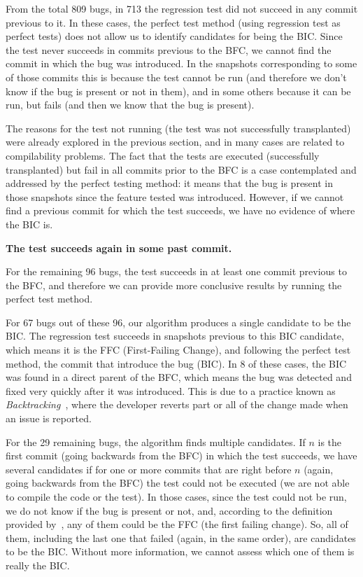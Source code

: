 From the total 809 bugs, in 713 the regression test did not succeed in any commit previous to it. 
In these cases, the perfect test method (using regression test as perfect tests) does not allow us to identify candidates for being the BIC. 
Since the test never succeeds in commits previous to the BFC, we cannot find the commit in which the bug was introduced. 
In the snapshots corresponding to some of those commits this is because the test cannot be run (and therefore we don't know if the bug is present or not in them), and in some others because it can be run, but fails (and then we know that the bug is present).

The reasons for the test not running (the test was not successfully transplanted) were already explored in the previous section, and in many cases are related to compilability problems. 
The fact that the tests are executed (successfully transplanted) but fail in all commits prior to the BFC is a case contemplated and addressed by the perfect testing method: it means that the bug is present in those snapshots since the feature tested was introduced.
However, if we cannot find a previous commit for which the test succeeds, we have no evidence of where the BIC is.

\textbf{The test succeeds again in some past commit.}

For the remaining 96 bugs, the test succeeds in at least one commit previous to the BFC, and therefore we can provide more conclusive results by running the perfect test method.

For 67 bugs out of these 96, our algorithm produces a single candidate to be the BIC. 
The regression test succeeds in snapshots previous to this BIC candidate, which means it is the FFC (First-Failing Change), and following the perfect test method, the commit that introduce the bug (BIC). 
In 8 of these cases, the BIC was found in a direct parent of the BFC, which means the bug was detected and fixed very quickly after it was introduced. 
This is due to a practice known as \textit{Backtracking}~\cite{yoon2012exploratory,yoon2014longitudinal}, where the developer reverts part or all of the change made when an issue is reported.

For the 29 remaining bugs, the algorithm finds multiple candidates. 
If $n$ is the first commit (going backwards from the BFC) in which the test succeeds, we have several candidates if for one or more commits that are right before $n$ (again, going backwards from the BFC) the test could not be executed (we are not able to compile the code or the test).
In those cases, since the test could not be run, we do not know if the bug is present or not, and, according to the definition provided by~\gema, any of them could be the FFC (the first failing change).
So, all of them, including the last one that failed (again, in the same order), are candidates to be the BIC. 
Without more information, we cannot assess which one of them is really the BIC.

